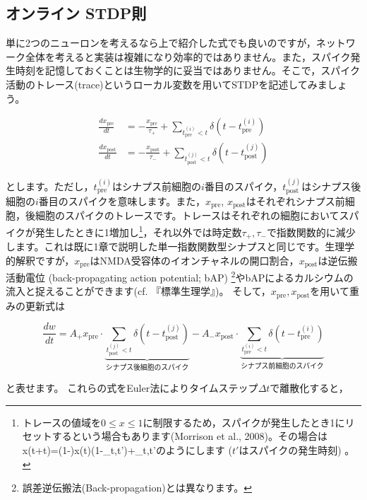 \subsection{オンライン STDP則}
単に2つのニューロンを考えるなら上で紹介した式でも良いのですが，ネットワーク全体を考えると実装は複雑になり効率的ではありません。また，スパイク発生時刻を記憶しておくことは生物学的に妥当ではありません。そこで，スパイク活動のトレース(trace)というローカル変数を用いてSTDPを記述してみましょう。


\begin{align}
\frac{dx_\text{pre}}{dt}&=-\frac{x_\text{pre}}{\tau_+}+\sum_{t_{\text{pre}}^{(i)} <t} \delta \left(t-t_{\text{pre}}^{(i)}\right)\\
\frac{dx_\text{post}}{dt}&=-\frac{x_\text{post}}{\tau_-}+\sum_{t_{\text{post}}^{(j)}<t} \delta \left(t-t_{\text{post}}^{(j)}\right)
\end{align}


とします。ただし，$t_{\text{pre}}^{(i)}$はシナプス前細胞の$i$番目のスパイク，$t_{\text{post}}^{(j)}$はシナプス後細胞の$i$番目のスパイクを意味します。また，$x_\text{pre}$, $x_\text{post}$はそれぞれシナプス前細胞，後細胞のスパイクのトレースです。トレースはそれぞれの細胞においてスパイクが発生したときに1増加し\footnote{トレースの値域を$0\leq x\leq1$に制限するため，スパイクが発生したとき1にリセットするという場合もあります(Morrison et al., 2008)。その場合はx(t+\Delta t)=\left(1-\right)x(t)\cdot(1-\delta_{t,t'})+\delta_{t,t'}のようにします ($t'$はスパイクの発生時刻) 。}，それ以外では時定数$\tau_+, \tau_-$で指数関数的に減少します。これは既に1章で説明した単一指数関数型シナプスと同じです。生理学的解釈ですが，$x_\text{pre}$はNMDA受容体のイオンチャネルの開口割合，$x_\text{post}$は逆伝搬活動電位 (back-propagating action potential; bAP) \footnote{誤差逆伝搬法(Back-propagation)とは異なります。}やbAPによるカルシウムの流入と捉えることができます(cf. 『標準生理学』)。
そして，$x_\text{pre}, x_\text{post}$を用いて重みの更新式は


\begin{equation}
\frac{dw}{dt}=A_+ x_\text{pre} \cdot \underbrace{\sum_{t_{\text{post}}^{(j)}<t} \delta \left(t-t_{\text{post}}^{(j)}\right)}_{\text{シナプス後細胞のスパイク}} - A_- x_{\text{post}} \cdot \underbrace{\sum_{t_{\text{pre}}^{(i)} <t} \delta \left(t-t_{\text{pre}}^{(i)}\right)}_{\text{シナプス前細胞のスパイク}}
\end{equation}


と表せます。
これらの式をEuler法によりタイムステップ$\Delta t$で離散化すると，


